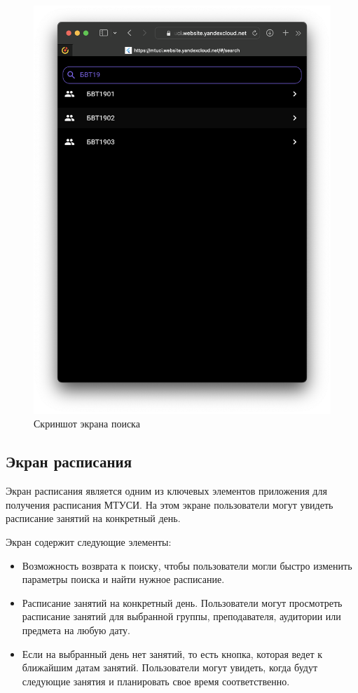 \begin{figure}[h]
\centering
\includegraphics[width=0.8\linewidth]{images/search_screen.png}
\caption{Скриншот экрана поиска}
\label{fig:mpr}
\end{figure}

\subsection{Экран расписания}
Экран расписания является одним из ключевых элементов приложения для получения расписания МТУСИ.
На этом экране пользователи могут увидеть расписание занятий на конкретный день.

Экран содержит следующие элементы:

\begin{itemize}
    \item Возможность возврата к поиску, 
    чтобы пользователи могли быстро изменить параметры поиска и найти нужное расписание.
    \item Расписание занятий на конкретный день.
    Пользователи могут просмотреть расписание занятий для выбранной группы,
    преподавателя, аудитории или предмета на любую дату.
    \item Если на выбранный день нет занятий,
    то есть кнопка, которая ведет к ближайшим датам занятий.
    Пользователи могут увидеть, когда будут следующие занятия и планировать свое время соответственно.
\end{itemize}


